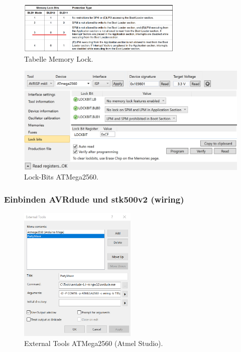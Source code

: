 
\begin{figure}[H]
	\centering
	\includegraphics[width=0.7\textwidth]{graphics/Tabelle_Memory_Lock}
	\caption{Tabelle Memory Lock.\cite[S.326]{atmel_atmel_2014}}
	\label{fig:Tabelle_Memory_Lock}
\end{figure}

\begin{figure}[H]
	\centering
	\includegraphics[width=\textwidth]{graphics/AtmelStudio_Locks}
	\caption{Lock-Bits ATMega2560.}
	\label{fig:AtmelStudio_Locks}
\end{figure}


\subsubsection{Einbinden AVRdude und stk500v2 (wiring)}\label{Appendix:AVR_STK500}

\begin{figure}[H]
	\centering
	\includegraphics[width=0.5\textwidth]{graphics/AtmelStudio_External_Tools}
	\caption{External Tools ATMega2560 (Atmel Studio).}
	\label{fig:AtmelStudio_External_Tools}
\end{figure}

